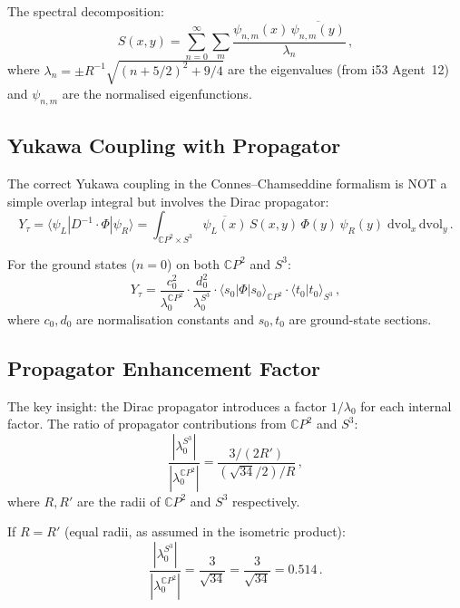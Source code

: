 \documentclass[11pt,a4paper]{article}
\newcommand{\CP}{\mathbb{C}P}
\begin{document}
The spectral decomposition:
\begin{equation}
S(x, y) = \sum_{n=0}^{\infty} \sum_{m} \frac{\psi_{n,m}(x)\,\overline{\psi_{n,m}(y)}}{\lambda_n}\,,
\end{equation}
where $\lambda_n = \pm R^{-1}\sqrt{(n+5/2)^2 + 9/4}$ are the eigenvalues (from i53 Agent~12) and $\psi_{n,m}$ are the normalised eigenfunctions.

\subsection{Yukawa Coupling with Propagator}

The correct Yukawa coupling in the Connes--Chamseddine formalism is NOT a simple overlap integral but involves the Dirac propagator:
\begin{equation}
Y_\tau = \langle \psi_L | D^{-1} \cdot \Phi | \psi_R \rangle = \int_{\CP^2 \times S^3} \overline{\psi_L(x)}\,S(x, y)\,\Phi(y)\,\psi_R(y)\;\mathrm{dvol}_x\,\mathrm{dvol}_y\,.
\end{equation}

For the ground states ($n = 0$) on both $\CP^2$ and $S^3$:
\begin{equation}
Y_\tau = \frac{c_0^2}{\lambda_0^{\CP^2}} \cdot \frac{d_0^2}{\lambda_0^{S^3}} \cdot \langle s_0 | \Phi | s_0 \rangle_{\CP^2} \cdot \langle t_0 | t_0 \rangle_{S^3}\,,
\end{equation}
where $c_0, d_0$ are normalisation constants and $s_0, t_0$ are ground-state sections.

\subsection{Propagator Enhancement Factor}

The key insight: the Dirac propagator introduces a factor $1/\lambda_0$ for each internal factor. The ratio of propagator contributions from $\CP^2$ and $S^3$:
\begin{equation}
\frac{|\lambda_0^{S^3}|}{|\lambda_0^{\CP^2}|} = \frac{3/(2R')}{(\sqrt{34}/2)/R}\,,
\end{equation}
where $R, R'$ are the radii of $\CP^2$ and $S^3$ respectively.

If $R = R'$ (equal radii, as assumed in the isometric product):
\begin{equation}
\frac{|\lambda_0^{S^3}|}{|\lambda_0^{\CP^2}|} = \frac{3}{\sqrt{34}} = \frac{3}{\sqrt{34}} = 0.514\,.
\end{equation}
\end{document}

